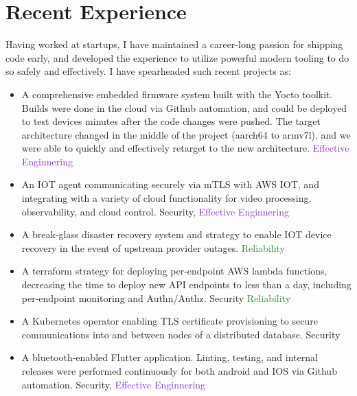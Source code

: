 \documentclass[letterpaper,11pt]{article}
\begin{document}
\section{Recent Experience} 
Having worked at startups, I have maintained a
career-long passion for shipping code early, and developed the experience to
utilize powerful modern tooling to do so safely and effectively. I have
spearheaded such recent projects as:
\begin{itemize} 
\item A comprehensive embedded firmware system built with the Yocto toolkit. Builds were done in the cloud via Github automation, and could be deployed to test devices minutes after the code changes were pushed. The target architecture
changed in the middle of the project (aarch64 to armv7l), and we were able to quickly and effectively retarget to the new architecture. \textcolor{BlueViolet}{Effective Enginnering}
\item An IOT agent communicating securely via mTLS with AWS IOT, and integrating with a variety of cloud functionality for video processing, observability, and cloud control. \textcolor{BrickRed}{Security}, \textcolor{BlueViolet}{Effective Enginnering}
\item A break-glass disaster recovery system and strategy to enable IOT device recovery in the event of upstream provider outages. \textcolor{ForestGreen}{Reliability}
\item A terraform strategy for deploying per-endpoint AWS lambda functions, decreasing the time to deploy new API endpoints to less than a day, including per-endpoint monitoring and Authn/Authz. \textcolor{BrickRed}{Security} \textcolor{ForestGreen}{Reliability}
\item A Kubernetes operator enabling TLS certificate provisioning to secure communications into and between nodes of a distributed database. \textcolor{BrickRed}{Security}
\item A bluetooth-enabled Flutter application. Linting, testing, and internal releases were performed continuously for both android and IOS via Github automation. \textcolor{BrickRed}{Security}, \textcolor{BlueViolet}{Effective Enginnering}
\end{itemize}
\
\end{document}
